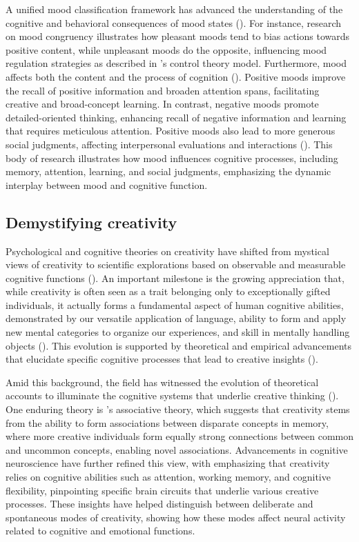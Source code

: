 \documentclass[../MA_Thesis.tex]{subfiles}
\begin{document}
A unified mood classification framework has advanced the understanding of the cognitive and behavioral consequences of mood states (\cite{lischetzke_mood_2022}). For instance, research on mood congruency illustrates how pleasant moods tend to bias actions towards positive content, while unpleasant moods do the opposite, influencing mood regulation strategies as described in \textcite{larsen_toward_2000}'s control theory model. Furthermore, mood affects both the content and the process of cognition (\cite{forgas_chapter_2017}). Positive moods improve the recall of positive information and broaden attention spans, facilitating creative and broad-concept learning. In contrast, negative moods promote detailed-oriented thinking, enhancing recall of negative information and learning that requires meticulous attention. Positive moods also lead to more generous social judgments, affecting interpersonal evaluations and interactions (\cite{forgas_mood_1995}). This body of research illustrates how mood influences cognitive processes, including memory, attention, learning, and social judgments, emphasizing the dynamic interplay between mood and cognitive function.

\subsection*{Demystifying creativity} 
Psychological and cognitive theories on creativity have shifted from mystical views of creativity to scientific explorations based on observable and measurable cognitive functions (\cite{finke_creative_1996}). An important milestone is the growing appreciation that, while creativity is often seen as a trait belonging only to exceptionally gifted individuals, it actually forms a fundamental aspect of human cognitive abilities, demonstrated by our versatile application of language, ability to form and apply new mental categories to organize our experiences, and skill in mentally handling objects (\cite{ward_creative_1999}). This evolution is supported by theoretical and empirical advancements that elucidate specific cognitive processes that lead to creative insights (\cite{finke_creative_1996}).

Amid this background, the field has witnessed the evolution of theoretical accounts to illuminate the cognitive systems that underlie creative thinking (\cite{johnson_divergent_2022}). One enduring theory is \textcite{mednick_associative_1962}'s associative theory, which suggests that creativity stems from the ability to form associations between disparate concepts in memory, where more creative individuals form equally strong connections between common and uncommon concepts, enabling novel associations. Advancements in cognitive neuroscience have further refined this view, with \textcite{dietrich_cognitive_2004} emphasizing that creativity relies on cognitive abilities such as attention, working memory, and cognitive flexibility, pinpointing specific brain circuits that underlie various creative processes. These insights have helped distinguish between deliberate and spontaneous modes of creativity, showing how these modes affect neural activity related to cognitive and emotional functions.
\end{document}
